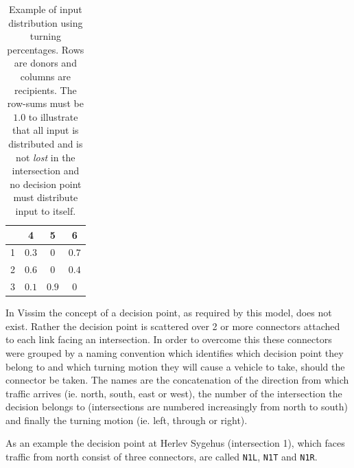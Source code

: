 \begin{table}[!ht]
\begin{center}
\begin{tabular}{l|ccc}
 	& 4 & 5 & 6 \\ \hline
1	& $0.3$ & 0 & $0.7$ \\
2	& $0.6$ & 0 & $0.4$ \\
3	& $0.1$ & $0.9$ & 0
\end{tabular}
\end{center}
\caption{Example of input distribution using turning percentages. Rows are donors and columns are recipients. The row-sums must be $1.0$ to illustrate that all input is distributed and is not \textit{lost} in the intersection and no decision point must distribute input to itself.}
\label{tbl:flow_dist_principle}
\end{table}

In Vissim the concept of a decision point, as required by this model, does not exist. Rather the decision point is scattered over 2 or more connectors attached to each link facing an intersection. In order to overcome this these connectors were grouped by a naming convention which identifies which decision point they belong to and which turning motion they will cause a vehicle to take, should the connector be taken. The names are the concatenation of the direction from which traffic arrives (ie. north, south, east or west), the number of the intersection the decision belongs to (intersections are numbered increasingly from north to south) and finally the turning motion (ie. left, through or right). 

As an example the decision point at Herlev Sygehus (intersection 1), which faces traffic from north consist of three connectors, are called \verb|N1L|, \verb|N1T| and \verb|N1R|.

